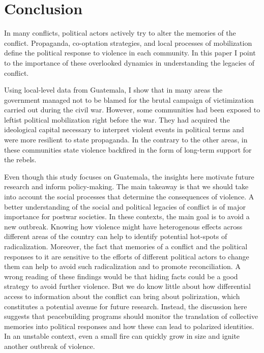 \documentclass[12pt, notitlepage]{article}
\begin{document}
\section*{Conclusion}

In many conflicts, political actors actively try to alter the memories of the conflict.
Propaganda, co-optation strategies, and local processes of mobilization define the political response to violence in each community.
In this paper I point to the importance of these overlooked dynamics in understanding the legacies of conflict.

Using local-level data from Guatemala, I show that in many areas the government managed not to be blamed for the brutal campaign of victimization carried out during the civil war.
However, some communities had been exposed to leftist political mobilization right before the war.
They had acquired the ideological capital necessary to interpret violent events in political terms and were more resilient to state propaganda.
In the contrary to the other areas, in these communities state violence backfired in the form of long-term support for the rebels.

Even though this study focuses on Guatemala, the insights here motivate future research and inform policy-making.
The main takeaway is that we should take into account the social processes that determine the consequences of violence.
A better understanding of the social and political legacies of conflict is of major importance for postwar societies.
In these contexts, the main goal is to avoid a new outbreak.
Knowing how violence might have heterogenous effects across different areas of the country can help to identify potential hot-spots of radicalization.
Moreover, the fact that memories of a conflict and the political responses to it are sensitive to the efforts of different political actors to change them can help to avoid such radicalization and to promote reconciliation.
A wrong reading of these findings would be that hiding facts could be a good strategy to avoid further violence.
But we do know little about how differential access to information about the conflict can bring about polirization, which constitutes a potential avenue for future research.
Instead, the discussion here suggests that peacebuilding programs should monitor the translation of collective memories into political responses and how these can lead to polarized identities.
In an unstable context, even a small fire can quickly grow in size and ignite another outbreak of violence.

\clearpage



% 
\end{document}
